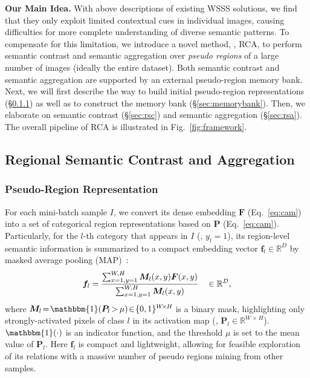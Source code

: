 \documentclass[10pt,twocolumn,letterpaper]{article}
\def\1{\mathbbm{1}}
\begin{document}
\noindent\textbf{Our Main Idea.} 
With above  descriptions of existing WSSS solutions, we find that they only exploit limited contextual cues in individual images, causing difficulties for more complete understanding of diverse semantic patterns.  To compensate for this limitation, we introduce a novel method, \ie, RCA, to perform semantic contrast and semantic aggregation over \textit{pseudo regions} of a large number of images (ideally the entire dataset). Both semantic contrast and semantic aggregation are supported by an external pseudo-region memory bank. Next, we will first describe the way to build initial pseudo-region representations (\S\ref{sec:prr}) as well as to construct the memory bank (\S\ref{sec:memorybank}). Then, we elaborate on semantic contrast (\S\ref{sec:rsc}) and semantic aggregation (\S\ref{sec:rsa}). The overall pipeline of RCA is illustrated in Fig.~\ref{fig:framework}. 



\subsection{Regional Semantic Contrast and Aggregation}

\subsubsection{Pseudo-Region Representation}\label{sec:prr}

For each mini-batch sample $I$, we convert its dense embedding $\bm{F}$ (Eq.~\ref{eq:cam}) into a set of categorical region representations based on $\bm{P}$ (Eq.~\ref{eq:cam}). Particularly, for the $l$-th category that appears in $I$ (\ie, $y_l\!=\!1$), its region-level semantic information is summarized to a compact embedding vector $\bm{f}_l\!\in\!\mathbb{R}^D$ by masked average pooling (MAP)~\cite{siam2019amp}:
\vspace{-3pt}
\begin{equation}\small\label{eq:h}
	\bm{f}_{l}  =  \frac{\sum_{x=1,y=1}^{W,H}\bm{M}_l(x,y) \bm{F}(x,y)}{\sum_{x=1,y=1}^{W,H}\bm{M}_l(x,y)}~~~\in\mathbb{R}^D,
	\vspace{-3pt}
\end{equation}
where $\bm{M}_{l} \!=\! \1(\bm{P}_{l\!} >_{\!} \mu)\!\in\!\{0,1\}^{W_{\!}\times_{\!}H_{\!}}$ is a binary mask, highlighting only strongly-activated pixels of class $l$ in its activation map (\ie, $\bm{P}_{l}\!\in\!\mathbb{R}^{W_{\!}\times_{\!}H}$). $\1(\cdot)$ is an indicator function, and the threshold $\mu$ is set to the mean value of $\bm{P}_l$. Here $\bm{f}_l$ is compact and lightweight, allowing for  feasible exploration of its relations with a massive number of pseudo regions mining from other samples.
\end{document}
